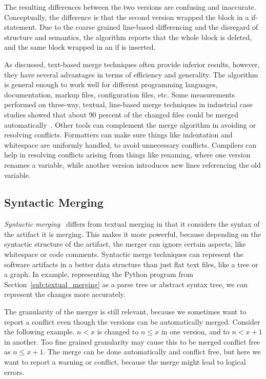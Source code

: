 \documentclass[a4paper,english]{ifimaster}
\begin{document}
The resulting differences between the two versions are confusing and inaccurate. Conceptually, the difference is that the second version wrapped the block in a if-statement. Due to the coarse grained line-based differencing and the disregard of structure and semantics, the algorithm reports that the whole block is deleted, and the same block wrapped in an if is inserted.

As discussed, text-based merge techniques often provide inferior results, however, they have several advantages in terms of efficiency and generality. The algorithm is general enough to work well for different programming languages, documentation, markup files, configuration files, etc. Some measurements performed on three-way, textual, line-based merge techniques in industrial case studies showed that about 90 percent of the changed files could be merged automatically~\cite{cite:large_scale_case_study}. Other tools can complement the merge algorithm in avoiding or resolving conflicts. Formatters can make sure things like indentation and whitespace are uniformly handled, to avoid unnecessary conflicts. Compilers can help in resolving conflicts arising from things like renaming, where one version renames a variable, while another version introduces new lines referencing the old variable.

\subsection{Syntactic Merging}%
\label{sub:syntactic_merging}

\textit{Syntactic merging}~\cite{cite:syntactic_software_merging} differs from textual merging in that it considers the syntax of the artifact it is merging. This makes it more powerful, because depending on the syntactic structure of the artifact, the merger can ignore certain aspects, like whitespace or code comments. Syntactic merge techniques can represent the software artifacts in a better data structure than just flat text files, like a tree or a graph. In example, representing the Python program from Section~\vref{sub:textual_merging} as a parse tree or abstract syntax tree, we can represent the changes more accurately.

The granularity of the merger is still relevant, because we sometimes want to report a conflict even though the versions can be automatically merged. Consider the following example. $n < x$ is changed to $n \leq x$ in one version, and to $n < x + 1$ in another. Too fine grained granularity may cause this to be merged conflict free as $n \leq x + 1$. The merge can be done automatically and conflict free, but here we want to report a warning or conflict, because the merge might lead to logical errors.
\end{document}
